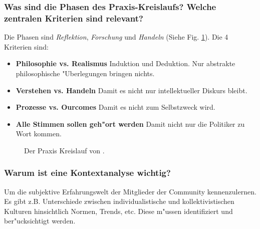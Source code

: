 \subsubsection{Was sind die Phasen des Praxis-Kreislaufs? Welche zentralen Kriterien sind relevant?}
Die Phasen sind \emph{Reflektion}, \emph{Forschung} und \emph{Handeln} (Siehe Fig. \ref{fig:prilleltensky2}). Die 4 Kriterien sind:
\begin{itemize}
        \item \textbf{Philosophie vs. Realismus} Induktion und Deduktion. Nur abstrakte philosophische "Uberlegungen bringen nichts.
        \item \textbf{Verstehen vs. Handeln} Damit es nicht nur intellektueller Diskurs bleibt.
        \item \textbf{Prozesse vs. Ourcomes} Damit es nicht zum Selbstzweck wird.
        \item \textbf{Alle Stimmen sollen geh"ort werden} Damit nicht nur die Politiker zu Wort kommen.
\end{itemize}
\begin{figure}[hb!]
        \begin{center}
        \end{center}
        \caption{Der Praxis Kreislauf von \textcite{prilleltensky_value-based_2001}.}
        \label{fig:prilleltensky2}
\end{figure}

\subsubsection{Warum ist eine Kontextanalyse wichtig?}
Um die subjektive Erfahrungswelt der Mitglieder der Community kennenzulernen. Es gibt z.B. Unterschiede zwischen individualistische und kollektivistischen Kulturen hinsichtlich Normen, Trends, etc. Diese m"ussen identifiziert und ber"ucksichtigt werden.



